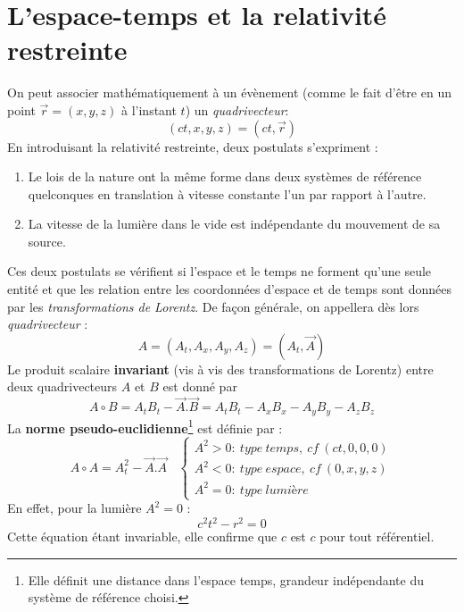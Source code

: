 \documentclass	[11pt, a4paper, openany]{book}
\begin{document}
\section{L'espace-temps et la relativité restreinte}
On peut associer mathématiquement à un évènement (comme le fait d'être en un point $\vec{r} = (x,y,z)$ à l'instant $t$) un \textit{quadrivecteur}:
\begin{equation}
(ct, x, y, z) = (ct, \vec{r})
\end{equation}
En introduisant la relativité restreinte, deux postulats s'expriment :
\begin{enumerate}
\item Le lois de la nature ont la même forme dans deux systèmes de référence quelconques en translation à vitesse constante l'un par rapport à l'autre.
\item La vitesse de la lumière dans le vide est indépendante du mouvement de sa source.
\end{enumerate}
Ces deux postulats se vérifient si l'espace et le temps ne forment qu'une seule entité et que les relation entre les coordonnées d'espace et de temps sont données par les \textit{transformations de Lorentz}. De façon générale, on appellera dès lors \textit{quadrivecteur} :
\begin{equation}
A = (A_t, A_x, A_y, A_z) = (A_t, \vec{A})
\end{equation}
Le produit scalaire \textbf{invariant} (vis à vis des transformations de Lorentz) entre deux quadrivecteurs $A$ et $B$ est donné par
\begin{equation}
A \circ B = A_tB_t - \vec{A}.\vec{B} = A_tB_t - A_xB_x - A_yB_y - A_zB_z
\end{equation}
La \textbf{norme pseudo-euclidienne}\footnote{Elle définit une distance dans l'espace temps, grandeur indépendante du système de référence choisi.} est définie par : 
\begin{equation}
A \circ A = A_t^2 - \vec A.\vec A\ \ \ \ \left\{\begin{array}{l}
A^2 > 0 :\ type\ temps,\ cf\ (ct, 0,0,0)\\
A^2 < 0 :\ type\ espace,\ cf\ (0, x, y , z)\\
A^2 = 0 :\ type\ lumi\textit{è}re
\end{array}\right.
\end{equation}
En effet, pour la lumière $A^2 = 0$ : 
\begin{equation}
c^2t^2 - r^2 = 0
\end{equation}
Cette équation étant invariable, elle confirme que $c$ est $c$ pour tout référentiel. \\
\end{document}
